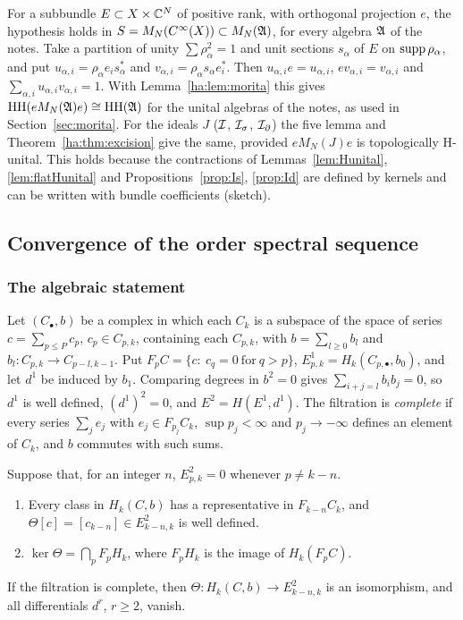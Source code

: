 \begin{remark}[Bundles]\label{ha:rem:bundles}
For a subbundle \(E\subset X\times\mathbb C^N\) of positive rank, with orthogonal
projection \(e\), the hypothesis holds in \(S=M_N(C^\infty(X))\subset
M_N(\mathfrak A)\), for every algebra \(\mathfrak A\) of the notes. Take a partition of
unity \(\sum\rho_\alpha^2=1\) and unit sections \(s_\alpha\) of \(E\) on
\(\operatorname{supp}\rho_\alpha\), and put \(u_{\alpha,i}=\rho_\alpha e_is_\alpha^*\) and
\(v_{\alpha,i}=\rho_\alpha s_\alpha e_i^*\). Then \(u_{\alpha,i}e=
u_{\alpha,i}\), \(ev_{\alpha,i}=v_{\alpha,i}\) and \(\sum_{\alpha,i}
u_{\alpha,i}v_{\alpha,i}=1\). With Lemma~\ref{ha:lem:morita} this gives
\(\operatorname{HH}(eM_N(\mathfrak A)e)\cong\operatorname{HH}(\mathfrak A)\) for the unital algebras of the notes, as
used in Section~\ref{sec:morita}. For the ideals \(J\) (\(\mathcal I\), \(\mathcal I_\sigma\),
\(\mathcal I_\partial\)) the five lemma and Theorem~\ref{ha:thm:excision} give the same,
provided \(eM_N(J)e\) is topologically H-unital. This holds because the
contractions of Lemmas~\ref{lem:Hunital}, \ref{lem:flatHunital} and
Propositions~\ref{prop:Is}, \ref{prop:Id} are defined by kernels and can
be written with bundle coefficients (sketch).
\end{remark}

\subsection{Convergence of the order spectral sequence}
\label{ha:subsec:conv}

\subsubsection*{The algebraic statement}
Let \((C_\bullet,b)\) be a complex in which each \(C_k\) is a subspace of
the space of series \(c=\sum_{p\le P}c_p\), \(c_p\in C_{p,k}\), containing
each \(C_{p,k}\), with \(b=\sum_{l\ge0}b_l\) and \(b_l:C_{p,k}\to
C_{p-l,k-1}\). Put \(F_pC=\{c:\ c_q=0\ \text{for}\ q>p\}\),
\(E^1_{p,k}=H_k(C_{p,\bullet},b_0)\), and let \(d^1\) be induced by \(b_1\).
Comparing degrees in \(b^2=0\) gives \(\sum_{i+j=l}b_ib_j=0\), so \(d^1\) is
well defined, \((d^1)^2=0\), and \(E^2=H(E^1,d^1)\). The filtration is
\emph{complete} if every series \(\sum_je_j\) with \(e_j\in F_{p_j}C_k\),
\(\sup p_j<\infty\) and \(p_j\to-\infty\) defines an element of \(C_k\), and
\(b\) commutes with such sums.

\begin{proposition}
\label{ha:prop:algconv}
Suppose that, for an integer \(n\), \(E^2_{p,k}=0\) whenever \(p\ne k-n\).
\begin{enumerate}
\item Every class in \(H_k(C,b)\) has a representative in \(F_{k-n}C_k\),
and \(\Theta[c]=[c_{k-n}]\in E^2_{k-n,k}\) is well defined.
\item \(\ker\Theta=\bigcap_pF_pH_k\), where \(F_pH_k\) is the image of
\(H_k(F_pC)\).
\end{enumerate}
If the filtration is complete, then \(\Theta:H_k(C,b)\to E^2_{k-n,k}\) is an
isomorphism, and all differentials \(d^r\), \(r\ge2\), vanish.
\end{proposition}


